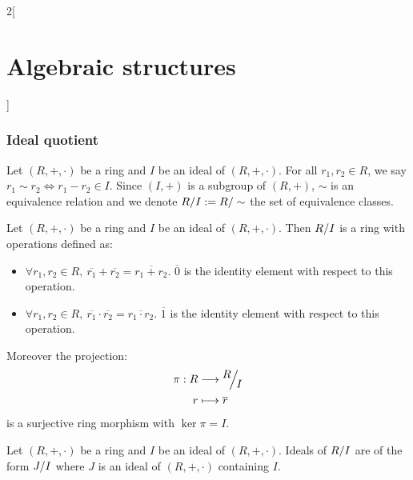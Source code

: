 \documentclass[../../../main.tex]{subfiles}
\begin{document}
\begin{multicols}{2}[\section{Algebraic structures}]
\subsubsection{Ideal quotient}
\begin{definition}
    Let $(R,+,\cdot)$ be a ring and $I$ be an ideal of $(R,+,\cdot)$. For all $r_1,r_2\in R$, we say $r_1\sim r_2\iff r_1-r_2\in I$. Since $(I,+)$ is a subgroup of $(R,+)$, $\sim$ is an equivalence relation and we denote $\quot{R}{I}:=\quot{R}{\sim}$ the set of equivalence classes.
\end{definition}
\begin{prop}
    Let $(R,+,\cdot)$ be a ring and $I$ be an ideal of $(R,+,\cdot)$. Then $\quot{R}{I}$ is a ring with operations defined as:
    \begin{itemize}
        \item $\forall r_1,r_2\in R,\ \overline{r_1}+\overline{r_2}=\overline{r_1+r_2}$. $\overline{0}$ is the identity element with respect to this operation.
        \item $\forall r_1,r_2\in R,\ \overline{r_1}\cdot\overline{r_2}=\overline{r_1\cdot r_2}$. $\overline{1}$ is the identity element with respect to this operation.
    \end{itemize}
    Moreover the projection:
    \begin{align*}
        \pi:R&\longrightarrow\quot{R}{I}\\
        r&\longmapsto\overline{r}
    \end{align*}
    is a surjective ring morphism with $\ker\pi=I$.
\end{prop}
\begin{corollary}
    Let $(R,+,\cdot)$ be a ring and $I$ be an ideal of $(R,+,\cdot)$. Ideals of $\quot{R}{I}$ are of the form $\quot{J}{I}$ where $J$ is an ideal of $(R,+,\cdot)$ containing $I$.
\end{corollary}

\end{multicols}
\end{document}
